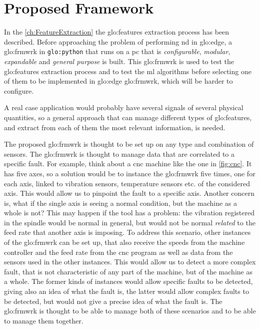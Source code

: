 \chapter{Proposed Framework}
\label{ch:Framework}

In the \autoref{ch:FeatureExtraction} the \gls{glo:feature}s extraction process has been described. Before approaching the problem of performing \gls{nd} in \gls{glo:edge}, a \gls{glo:frmwrk} in \texttt{\gls{glo:python}} that runs on a \gls{pc} that is \emph{configurable}, \emph{modular}, \emph{expandable} and \emph{general purpose} is built. This \gls{glo:frmwrk} is used to test the \gls{glo:feature}s extraction process and to test the \gls{ml} algorithms before selecting one of them to be implemented in \gls{glo:edge} \gls{glo:frmwrk}, which will be harder to configure.

A real case application would probably have several signals of several physical quantities, so a general approach that can manage different types of \gls{glo:feature}s, and extract from each of them the most relevant information, is needed.

The proposed \gls{glo:frmwrk} is thought to be set up on any type and combination of sensors. The \gls{glo:frmwrk} is thought to manage data that are correlated to a specific fault. For example, think about a \gls{cnc} machine like the one in \autoref{fig:cnc}. It has five axes, so a solution would be to instance the \gls{glo:frmwrk} five times, one for each axis, linked to vibration sensors, temperature sensors etc. of the considered axis. This would allow us to pinpoint the fault to a specific axis. Another concern is, what if the single axis is seeing a normal condition, but the machine as a whole is not? This may happen if the tool has a problem: the vibration registered in the spindle would be normal in general, but would not be normal \emph{related} to the feed rate that another axis is imposing. To address this scenario, other instances of the \gls{glo:frmwrk} can be set up, that also receive the speeds from the machine controller and the feed rate from the \gls{cnc} program as well as data from the sensors used in the other instances. This would allow us to detect a more complex fault, that is not characteristic of any part of the machine, but of the machine as a whole. The former kinds of instances would allow specific faults to be detected, giving also an idea of what the fault is, the latter would allow complex faults to be detected, but would not give a precise idea of what the fault is. The \gls{glo:frmwrk} is thought to be able to manage both of these scenarios and to be able to manage them together.

